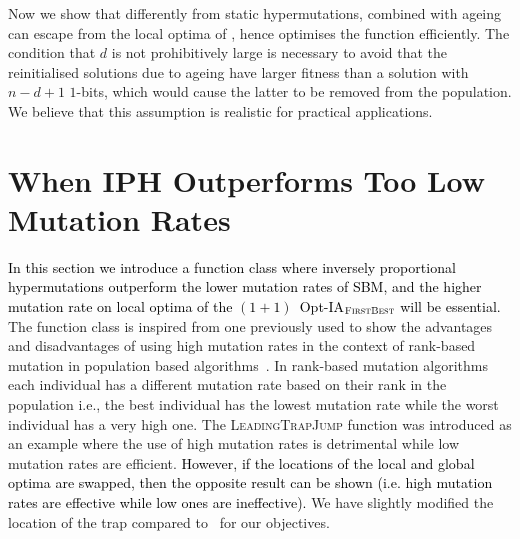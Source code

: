\documentclass[lettersize,journal]{IEEEtran}
\newcommand{\new}[1]{\textcolor{black}{#1}}
\begin{document}
Now we show that differently from static hypermutations, {\linHD }
combined with ageing can escape from the local optima of \cliff, 
hence optimises the function efficiently. The condition that $d$ is not prohibitively large is necessary to avoid
that the reinitialised solutions due to ageing have larger fitness than a solution with $n-d+1$ $1$-bits, {\color{black} which would cause the latter to be removed from the population}.
We believe that this assumption is realistic for practical applications.

 
 
 {}
 
 
 
\section{When IPH Outperforms Too Low Mutation Rates}
\new{In this section we introduce a function class where inversely proportional hypermutations outperform the lower mutation rates of SBM, and the higher mutation rate on local optima of the $(1+1)$~Opt-IA$_{\textsc{FirstBest}}$ will be essential.}
The function class is inspired from one previously used to show the advantages and disadvantages of using high mutation rates in the context of rank-based mutation in population based algorithms~\cite{OlivetoLehreNeumann09}.
In rank-based mutation algorithms~\cite{RankBasedMutation} each individual has a different mutation rate based on their rank in the population i.e., the best individual has the lowest mutation rate while the worst individual has a very high one.
The \textsc{LeadingTrapJump} function was introduced as an example where the use of high mutation rates is detrimental while low mutation rates are efficient. \new{However, if the locations of the local and global optima are swapped, then the opposite result can be shown (i.e. high mutation rates are effective while low ones are ineffective).}
We have slightly modified the location of the trap compared to~\cite{OlivetoLehreNeumann09} for our objectives. 
\end{document}
